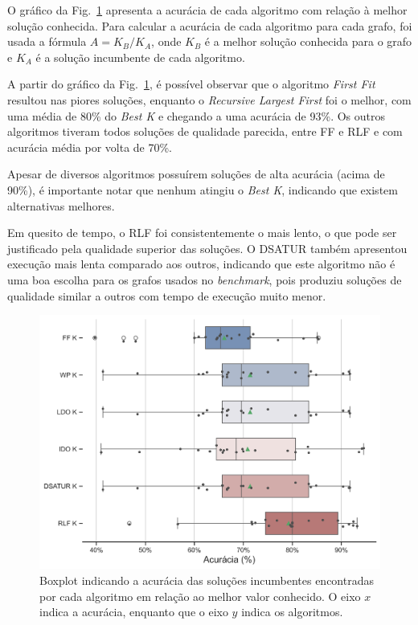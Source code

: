 \documentclass[10pt, twocolumn]{article}
\begin{document}
O gráfico da Fig.~\ref{fig:boxplot} apresenta a acurácia de cada algoritmo com
relação à melhor solução conhecida.
Para calcular a acurácia de cada algoritmo para cada grafo, foi usada a fórmula
$A=K_{B}/K_A$, onde $K_{B}$ é a melhor solução conhecida para o grafo e
$K_A$ é a solução incumbente de cada algoritmo.

A partir do gráfico da Fig.~\ref{fig:boxplot}, é possível observar que o algoritmo
\emph{First Fit} resultou nas piores soluções, enquanto o \emph{Recursive Largest First}
foi o melhor, com uma média de 80\% do \emph{Best K} e chegando a uma acurácia de 93\%.
Os outros algoritmos tiveram todos soluções de qualidade parecida, entre FF e RLF
e com acurácia média por volta de 70\%.

Apesar de diversos algoritmos possuírem soluções de alta acurácia (acima de 90\%),
é importante notar que nenhum atingiu o \emph{Best K}, indicando que existem
alternativas melhores.

Em quesito de tempo, o RLF foi consistentemente o mais lento, o que pode ser
justificado pela qualidade superior das soluções.
O DSATUR também apresentou execução mais lenta comparado aos outros, indicando
que este algoritmo não é uma boa escolha para os grafos usados no \emph{benchmark},
pois produziu soluções de qualidade similar a outros com tempo de execução muito menor.

\begin{figure}[H]
  \centering
  \includegraphics[scale=0.42]{img/boxplot.png}
  \caption{Boxplot indicando a acurácia das soluções incumbentes encontradas por
  cada algoritmo em relação ao melhor valor conhecido.
  O eixo $x$ indica a acurácia, enquanto que o eixo $y$ indica os algoritmos.
  }
  \label{fig:boxplot}
\end{figure}
\end{document}
